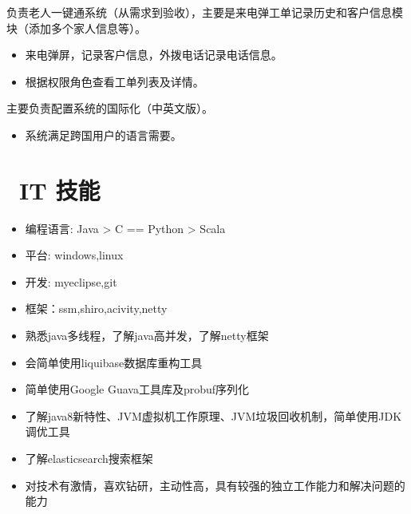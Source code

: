 \documentclass{resume}
\begin{document}
\begin{onehalfspacing}
负责老人一键通系统（从需求到验收），主要是来电弹工单记录历史和客户信息模块（添加多个家人信息等）。
\begin{itemize}
  \item 来电弹屏，记录客户信息，外拨电话记录电话信息。
  \item 根据权限角色查看工单列表及详情。

\end{itemize}
\end{onehalfspacing}

\begin{onehalfspacing}
主要负责配置系统的国际化（中英文版）。
\begin{itemize}
  \item 系统满足跨国用户的语言需要。
\end{itemize}
\end{onehalfspacing}


\section{\faCogs\ IT 技能}
\begin{itemize}[parsep=0.5ex]
  \item 编程语言: Java > C == Python > Scala
  \item 平台: windows,linux
  \item 开发: myeclipse,git
  \item 框架：ssm,shiro,acivity,netty
  \item 熟悉java多线程，了解java高并发，了解netty框架
  \item 会简单使用liquibase数据库重构工具
  \item 简单使用Google Guava工具库及probuf序列化
  \item 了解java8新特性、JVM虚拟机工作原理、JVM垃圾回收机制，简单使用JDK调优工具
  \item 了解elasticsearch搜索框架
  \item 对技术有激情，喜欢钻研，主动性高，具有较强的独立工作能力和解决问题的能力
\end{itemize}
\end{document}
